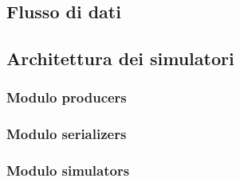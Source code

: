 \subsection{Flusso di dati}
\subsection{Architettura dei simulatori}
\subsubsection{Modulo producers}
\subsubsection{Modulo serializers}
\subsubsection{Modulo simulators}
